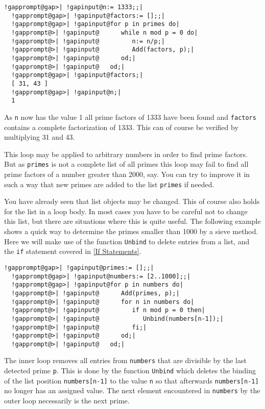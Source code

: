 \documentclass[a4paper,11pt]{report}
\begin{document}
{{ 
\begin{Verbatim}[commandchars=!@|,fontsize=\small,frame=single,label=Example]
  !gapprompt@gap>| !gapinput@n:= 1333;;|
  !gapprompt@gap>| !gapinput@factors:= [];;|
  !gapprompt@gap>| !gapinput@for p in primes do|
  !gapprompt@>| !gapinput@      while n mod p = 0 do|
  !gapprompt@>| !gapinput@         n:= n/p;|
  !gapprompt@>| !gapinput@         Add(factors, p);|
  !gapprompt@>| !gapinput@      od;|
  !gapprompt@>| !gapinput@   od;|
  !gapprompt@gap>| !gapinput@factors;|
  [ 31, 43 ]
  !gapprompt@gap>| !gapinput@n;|
  1
\end{Verbatim}
 

 As \texttt{n} now has the value 1 all prime factors of 1333 have been found and \texttt{factors} contains a complete factorization of 1333. This can of course be verified by
multiplying 31 and 43. 

 This loop may be applied to arbitrary numbers in order to find prime factors.
But as \texttt{primes} is not a complete list of all primes this loop may fail to find all prime
factors of a number greater than 2000, say. You can try to improve it in such
a way that new primes are added to the list \texttt{primes} if needed. 

 You have already seen that list objects may be changed. This of course also
holds for the list in a loop body. In most cases you have to be careful not to
change this list, but there are situations where this is quite useful. The
following example shows a quick way to determine the primes smaller than 1000
by a sieve method. Here we will make use of the function \texttt{Unbind} to delete entries from a list, and the \texttt{if} statement covered in \ref{If Statements}. 

 
\begin{Verbatim}[commandchars=!@|,fontsize=\small,frame=single,label=Example]
  !gapprompt@gap>| !gapinput@primes:= [];;|
  !gapprompt@gap>| !gapinput@numbers:= [2..1000];;|
  !gapprompt@gap>| !gapinput@for p in numbers do|
  !gapprompt@>| !gapinput@      Add(primes, p);|
  !gapprompt@>| !gapinput@      for n in numbers do|
  !gapprompt@>| !gapinput@         if n mod p = 0 then|
  !gapprompt@>| !gapinput@            Unbind(numbers[n-1]);|
  !gapprompt@>| !gapinput@         fi;|
  !gapprompt@>| !gapinput@      od;|
  !gapprompt@>| !gapinput@   od;|
\end{Verbatim}
 

 The inner loop removes all entries from \texttt{numbers} that are divisible by the last detected prime \texttt{p}. This is done by the function \texttt{Unbind} which deletes the binding of the list position \texttt{numbers[n-1]} to the value \texttt{n} so that afterwards \texttt{numbers[n-1]} no longer has an assigned value. The next element encountered in \texttt{numbers} by the outer loop necessarily is the next prime. 

}}
\end{document}
